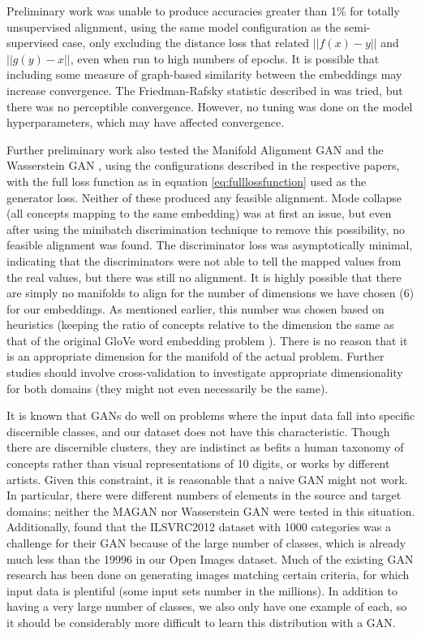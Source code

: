 Preliminary work was unable to produce accuracies greater than 1\% for totally unsupervised alignment, using the same model configuration as the semi-supervised case, only excluding the distance loss that related $||f(x) - y||$ and $||g(y) - x||$, even when run to high numbers of epochs. It is possible that including some measure of graph-based similarity between the embeddings may increase convergence. The Friedman-Rafsky statistic described in \cite{torchtwosample} was tried, but there was no perceptible convergence. However, no tuning was done on the model hyperparameters, which may have affected convergence. 

Further preliminary work also tested the Manifold Alignment GAN \cite{magan} and the Wasserstein GAN \cite{WassersteinGAN}, using the configurations described in the respective papers, with the full loss function as in  equation \ref{eq:fulllossfunction} used as the generator loss. Neither of these produced any feasible alignment. Mode collapse (all concepts mapping to the same embedding) was at first an issue, but even after using the minibatch discrimination technique \cite{ImprovedTechniquesTrainingGANS} to remove this possibility, no feasible alignment was found. The discriminator loss was asymptotically minimal, indicating that the discriminators were not able to tell the mapped values from the real values, but there was still no alignment. It is highly possible that there are simply no manifolds to align for the number of dimensions we have chosen (6) for our embeddings. As mentioned earlier, this number was chosen based on heuristics (keeping the ratio of concepts relative to the dimension the same as that of the original GloVe word embedding problem \cite{GloVe}). There is no reason that it is an appropriate dimension for the manifold of the actual problem. Further studies should involve cross-validation to investigate appropriate dimensionality for both domains (they might not even necessarily be the same). 

It is known that GANs do well on problems where the input data fall into specific discernible classes, and our dataset does not have this characteristic. Though there are discernible clusters, they are indistinct as befits a human taxonomy of concepts rather than visual representations of 10 digits, or works by different artists. Given this constraint, it is reasonable that a naive GAN might not work. In particular, there were different numbers of elements in the source and target domains; neither the MAGAN nor Wasserstein GAN were tested in this situation. Additionally, \cite{ImprovedTechniquesTrainingGANS} found that the ILSVRC2012 dataset with 1000 categories was a challenge for their GAN because of the large number of classes, which is already much less than the 19996 in our Open Images dataset. Much of the existing GAN research has been done on generating images matching certain criteria, for which input data is plentiful (some input sets number in the millions). In addition to having a very large number of classes, we also only have one example of each, so it should be considerably more difficult to learn this distribution with a GAN. 